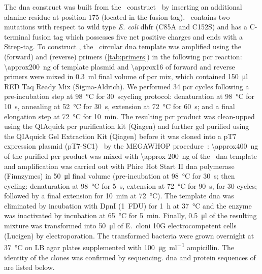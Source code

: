 The  \gls{dna} construct was built from the \DHFRt\ construct~\cite{Soskine-Biesemans-2015} by
inserting an additional alanine residue at position 175 (located in the fusion tag). \DHFRt\ contains two
mutations with respect to wild type \textit{E. coli} \gls{dhfr} (C85A and C152S) and has a C-terminal fusion
tag which possesses five net positive charges and ends with a Strep-tag. To construct , the \DHFRt\
circular \gls{dna} template was amplified using the  (forward) and 
(reverse) primers (\cref{tab:primers}) in the following \gls{pcr} reaction: \SI{\approx200}{\nano\gram} of
template plasmid and \SI{\approx16}{\uM} of forward and reverse primers were mixed in \SI{0.3}{\milli\litre}
final volume of \gls{pcr} mix, which contained \SI{150}{\micro\litre} RED Taq Ready Mix (Sigma-Aldrich). We
performed 34 \gls{pcr} cycles following a pre-incubation step at \SI{98}{\celsius} for \SI{30}{\second}cycling
protocol: denaturation at \SI{98}{\celsius} for \SI{10}{\second}, annealing at \SI{52}{\celsius} for
\SI{30}{\second}, extension at \SI{72}{\celsius} for \SI{60}{\second}; and a final elongation step at
\SI{72}{\celsius} for \SI{10}{\minute}. The resulting \gls{pcr} product was clean-upped using the QIAquick
\gls{pcr} purification kit (Qiagen) and further gel purified using the QIAquick Gel Extraction Kit (Qiagen)
before it was cloned into a pT7 expression plasmid (pT7-SC1)~\cite{Miles-2001} by the MEGAWHOP
procedure~\cite{Miyazaki-2011}: \SI{\approx400}{\nano\gram} of the purified \gls{pcr} product was mixed with
\SI{\approx 200}{\nano\gram} of the \DHFRt\ \gls{dna} template and amplification was carried out with Phire
Hot Start II \gls{dna} polymerase (Finnzymes) in \SI{50}{\micro\litre} final volume (pre-incubation at
\SI{98}{\celsius} for \SI{30}{\second}; then cycling: denaturation at \SI{98}{\celsius} for \SI{5}{\second},
extension at \SI{72}{\celsius} for \SI{90}{\second}, for 30 cycles; followed by a final extension for
\SI{10}{\minute} at \SI{72}{\celsius}). The template \gls{dna} was eliminated by incubation with DpnI (1~FDU)
for \SI{1}{\hour} at \SI{37}{\celsius} and the enzyme was inactivated by incubation at \SI{65}{\celsius} for
\SI{5}{\minute}. Finally, \SI{0.5}{\micro\litre} of the resulting mixture was transformed into
\SI{50}{\micro\litre} of E.~cloni\textsuperscript{\textregistered} 10G electrocompetent cells (Lucigen) by
electroporation. The transformed bacteria were grown overnight at \SI{37}{\celsius} on LB agar plates
supplemented with \SI{100} {\micro\gram\per\milli\litre} ampicillin. The identity of the clones was confirmed
by sequencing. \gls{dna} and protein sequences of \DHFR{4}{S} are listed below.

